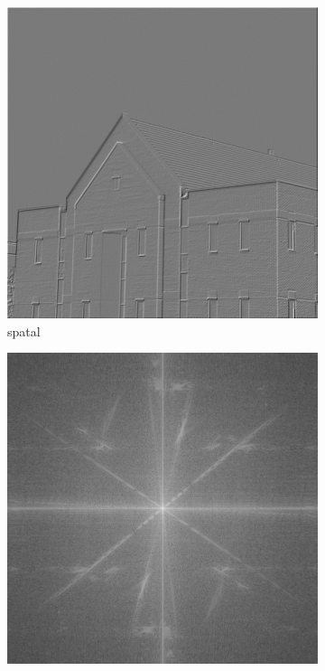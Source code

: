\documentclass[
	12pt, %
]{style/fphw}
\begin{document}
\begin{figure}[H]
     \centering
     \begin{subfigure}[b]{0.45\textwidth}
         \centering
         \includegraphics[width=\textwidth]{Q5_1_spatial.png}
         \caption{spatal}
         \label{Q5_1_spatial.png}
     \end{subfigure}
     \hfill
         \begin{subfigure}[b]{0.45\textwidth}
         \centering
         \includegraphics[width=\textwidth]{Q5_1_spectrum.png}

\end{subfigure}
\end{figure}
\end{document}
